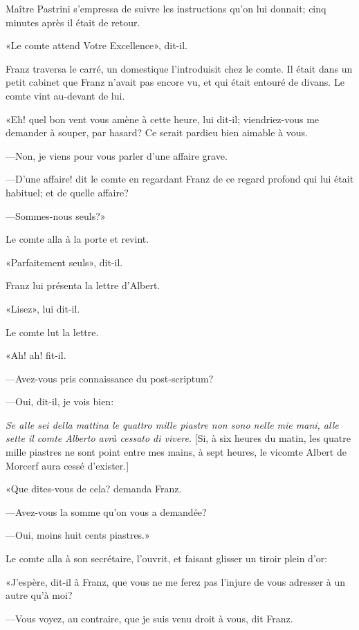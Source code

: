 Maître Pastrini s'empressa de suivre les instructions qu'on lui donnait; cinq minutes après il était de retour. 

«Le comte attend Votre Excellence», dit-il. 

Franz traversa le carré, un domestique l'introduisit chez le comte. Il était dans un petit cabinet que Franz n'avait pas encore vu, et qui était entouré de divans. Le comte vint au-devant de lui. 

«Eh! quel bon vent vous amène à cette heure, lui dit-il; viendriez-vous me demander à souper, par hasard? Ce serait pardieu bien aimable à vous. 

—Non, je viens pour vous parler d'une affaire grave. 

—D'une affaire! dit le comte en regardant Franz de ce regard profond qui lui était habituel; et de quelle affaire?  

—Sommes-nous seuls?» 

Le comte alla à la porte et revint. 

«Parfaitement seuls», dit-il. 

Franz lui présenta la lettre d'Albert. 

«Lisez», lui dit-il. 

Le comte lut la lettre. 

«Ah! ah! fit-il.  

—Avez-vous pris connaissance du post-scriptum? 

—Oui, dit-il, je vois bien: 

\begin{mail}{}{}
\textit{Se alle sei della mattina le quattro mille piastre non sono nelle mie mani, alle sette il comte Alberto avrà cessato di vivere.} [Si, à six heures du matin, les quatre mille piastres ne sont point entre mes mains, à sept heures, le vicomte Albert de Morcerf aura cessé d'exister.] 
\end{mail}

«Que dites-vous de cela? demanda Franz. 

—Avez-vous la somme qu'on vous a demandée? 

—Oui, moins huit cents piastres.» 

Le comte alla à son secrétaire, l'ouvrit, et faisant glisser un tiroir plein d'or: 

«J'espère, dit-il à Franz, que vous ne me ferez pas l'injure de vous adresser à un autre qu'à moi? 

—Vous voyez, au contraire, que je suis venu droit à vous, dit Franz. 

